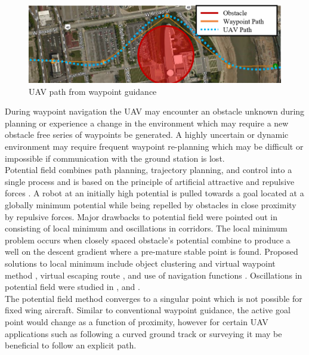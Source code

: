 \documentclass[conf]{new-aiaa}
\begin{document}
\begin{figure}[H]
	\centering
	\includegraphics[width=0.7\linewidth]{Figures/simpleWaypointsWithUAVPath}
	\caption{UAV path from waypoint guidance}
	\label{fig:simplewaypointsWithUAVPath}
\end{figure}


During waypoint navigation the UAV may encounter an obstacle unknown during planning or experience a change in the environment which may require a new obstacle free series of waypoints be generated. A highly uncertain or dynamic environment may require frequent waypoint re-planning which may be difficult or impossible if communication with the ground station is lost. \\


 
Potential field combines path planning, trajectory planning, and control into a single process \cite{rimon_exact_1992}  and is based on the principle of artificial attractive and repulsive forces \cite{khatib_real-time_1986}. A robot at an initially high potential is pulled towards a goal located at a globally minimum potential while being repelled by obstacles in close proximity by repulsive forces. Major drawbacks to potential field were pointed out in \cite{koren_potential_1991} consisting of local minimum and oscillations in corridors. The local minimum problem occurs when closely spaced obstacle's potential combine to produce a well on the descent gradient where a pre-mature stable point is found. Proposed solutions to local minimum include object clustering and virtual waypoint method \cite{liu_virtual-waypoint_2016}, virtual escaping route \cite{kim_escaping_2009}, and use of navigation functions \cite{goerzen_survey_2010}. Oscillations in potential field were studied in \cite{lei_tang_novel_2010}, and \cite{li_efficient_2012}. \\

The potential field method converges to a singular point which is not possible for fixed wing aircraft. Similar to conventional waypoint guidance, the active goal point would change as a function of proximity, however for certain UAV applications such as following a curved ground track or surveying it may be beneficial to follow an explicit path. \\
	
\end{document}
